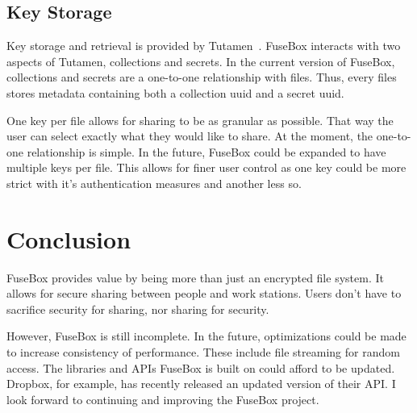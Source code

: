 \documentclass[11pt,twocolumn,letterpaper]{article}
\newcommand{\appname}{FuseBox }
\newcommand{\appnameWOspace}{FuseBox}
\newcommand{\custosWOspace}{Tutamen}
\begin{document}
\subsection{Key Storage}
\label{sec:ksimp}
Key storage and retrieval is provided
by \custosWOspace~\cite{Pytutamen}. \appname interacts with two aspects
of \custosWOspace, collections and secrets. In the current version
of \appnameWOspace, collections and secrets are a one-to-one
relationship with files. Thus, every files stores metadata containing
both a collection uuid and a secret uuid. 
\par One key per file allows for sharing to be as granular as
possible. That way the user can select exactly what they would like to share.
At the moment, the one-to-one relationship is simple. In the future, \appname
could be expanded to have multiple keys per file. This allows for
finer user control as one key could be more strict with it's
authentication measures and another less so.   

\section{Conclusion}
\label{sec:conclusion}
\appname provides value by being more than just an encrypted file
system. It allows for secure sharing between people and work stations.
Users don't have to sacrifice security for sharing, nor sharing for
security. 
\par However, \appname is still incomplete. In the future, optimizations
could be made to increase consistency of performance. These include
file streaming for random access. The libraries and APIs \appname is
built on could afford to be updated. Dropbox, for example, has recently released an
updated version of their API. I look forward to continuing and
improving the \appname project.    



\end{document}
